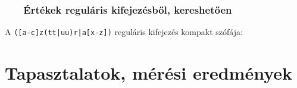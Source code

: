 \documentclass[
    aspectratio=169,
]{beamer}
\newcommand{\slidetitle}[2]{\frametitle{{\small #1 ~ \ding{226} ~ } \normalsize \textbf{#2} }}
\begin{document}
\begin{frame}[t,noframenumbering]
    \slidetitle{\sectionshorttitle}{Értékek reguláris kifejezésből, kereshetően}
    \centering
    {\Large A \texttt{\colorbox{Goldenrod!10}{([a-c]z(tt|uu)r|a[x-z])}} reguláris kifejezés {\color{red}kompakt} szófája:}
    
    \vspace{1.2cm}
    
    
\end{frame}

\section{Tapasztalatok, mérési eredmények}
\def\sectionshorttitle{\arabic{section}. Tapasztalatok}
\end{document}
